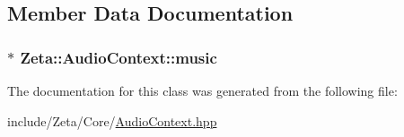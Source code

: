 \subsection{Member Data Documentation}
\hypertarget{classZeta_1_1AudioContext_aae43d48fd2d78a63baaf534d7df56481}{
\subsubsection[{music}]{$\ast$ Zeta\+::\+Audio\+Context\+::music\hspace{0.3cm}{\ttfamily [private]}}}\label{classZeta_1_1AudioContext_aae43d48fd2d78a63baaf534d7df56481}


The documentation for this class was generated from the following file\+:\begin{DoxyCompactItemize}
\item 
include/\+Zeta/\+Core/\hyperlink{AudioContext_8hpp}{Audio\+Context.\+hpp}\end{DoxyCompactItemize}
